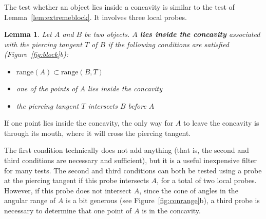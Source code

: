 \documentclass[10pt,twocolumn]{article}
\newcommand{\Comment}[1]{\relax}  %
\newcommand{\QED}{\vrule height 1.4ex width 1.0ex depth -.1ex\ \vspace{.3in}} %
\newcommand{\prf}{\noindent{{\bf Proof}:\ \ \ }}
\newtheorem{lemma}{Lemma}
\begin{document}
\Comment{
Note that the test of Lemma~\ref{lem:extremeblock}
is much simpler than the naive interpretation of the problem as an object
location problem 'does $A$ lie completely inside the region blocked behind $B$?'
}

The test whether an object lies inside a concavity is similar to the test of 
Lemma~\ref{lem:extremeblock}.
It involves three local probes.

\begin{lemma}
\label{lem:inconcavity}
Let $A$ and $B$ be two objects.
$A$ {\bf lies inside the concavity} associated with the piercing tangent $T$ of $B$ 
if the following conditions are satisfied (Figure~\ref{fig:block}b):
\begin{itemize}
\item $\mbox{range}(A) \subset \mbox{range}(B,T)$
\item one of the points of $A$ lies inside the concavity
\item the piercing tangent $T$ intersects $B$ before $A$
\end{itemize}
\end{lemma}
\prf
If one point lies inside the concavity, the only way for $A$ to leave the concavity
is through its mouth, where it will cross the piercing tangent.
\QED

The first condition technically does not add anything (that is, the second and third
conditions are necessary and sufficient), but it is a useful inexpensive
filter for many tests.
The second and third conditions can both be tested using a probe at the piercing tangent
if this probe intersects $A$, for a total of two local probes.
However, if this probe does not intersect $A$, since the cone of angles in the
angular range of $A$ is a bit generous (see Figure~\ref{fig:conrange}b), a third probe
is necessary to determine that one point of $A$ is in the concavity.


\end{document}
